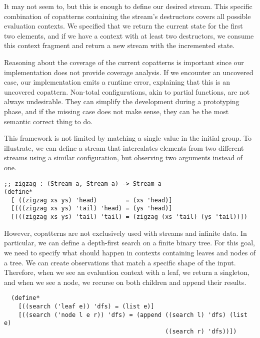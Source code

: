 
It may not seem to, but this is enough to define our desired stream.
This specific combination of copatterns containing the stream's destructors covers all possible evaluation contexts.
We specified that we return the current state for the first two elements, and if we have a context with at least two  destructors, we consume this context fragment and return a new stream with the incremented state.   

Reasoning about the coverage of the current copatterns is important since our implementation does not provide coverage analysis.
If we encounter an uncovered case, our implementation emits a runtime error, explaining that this is an uncovered copattern.
Non-total configurations, akin to partial functions, are not always undesirable. They can simplify the development during a prototyping phase, and if the missing case does not make sense, they can be the most semantic correct thing to do.

This framework is not limited by matching a single value in the initial group.
To illustrate, we can define a stream that intercalates elements from two different streams using a similar configuration, but observing two arguments instead of one.


\begin{verbatim}
;; zigzag : (Stream a, Stream a) -> Stream a
(define*
  [ ((zigzag xs ys) 'head)        = (xs 'head)]
  [(((zigzag xs ys) 'tail) 'head) = (ys 'head)]
  [(((zigzag xs ys) 'tail) 'tail) = (zigzag (xs 'tail) (ys 'tail))])
\end{verbatim}

However, copatterns are not exclusively used with streams and infinite data.
In particular, we can define a depth-first search on a finite binary tree.
For this goal, we need to specify what should happen in contexts containing leaves and nodes of a tree.
We can create observations that match a specific shape of the input.
Therefore, when we see an evaluation context with a leaf, we return a singleton, and when we see a node, we recurse on both children and append their results.

\begin{verbatim}
  (define*
    [((search ('leaf e)) 'dfs) = (list e)]
    [((search ('node l e r)) 'dfs) = (append ((search l) 'dfs) (list e)
                                             ((search r) 'dfs))])
  \end{verbatim}

